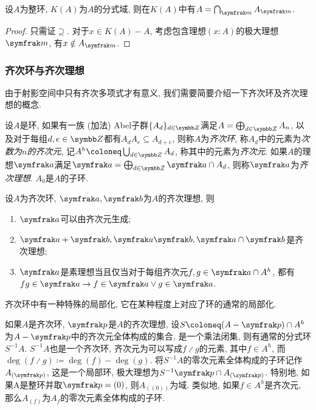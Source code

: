 \begin{proposition}\label{prop:integraldomainlocalizationintersection}
  设$A$为整环, $K(A)$为$A$的分式域, 则在$K(A)$中有$A=\bigcap_{\ideal{m}}A_{\ideal{m}}$.
\end{proposition}

\begin{proof}
  只需证$\supseteq$. 对于$x\in K(A)-A$, 考虑包含理想$(x{:}A)$的极大理想$\ideal{m}$, 有$x\notin A_{\ideal{m}}$.
\end{proof}

\subsubsection{齐次环与齐次理想}

由于射影空间中只有齐次多项式才有意义, 我们需要简要介绍一下齐次环及齐次理想的概念.

\begin{definition}
  设$A$是环, 如果有一族 (加法) Abel子群$\{A_d\}_{d\in \ZZ}$满足$A=\bigoplus_{d\in\ZZ}A_n$, 以及对于每组$d, e\in \ZZ$都有$A_dA_e\subseteq A_{d+e}$, 则称$A$为\emph{齐次环}, 称$A_d$中的元素为\emph{次数为$n$的齐次元}, 记$A^h\coloneq\bigcup_{d\in\ZZ}A_d$, 称其中的元素为\emph{齐次元}. 如果$A$的理想$\ideal{a}$满足$\ideal{a}=\bigoplus_{d\in \ZZ}\ideal{a}\cap A_d$, 则称$\ideal{a}$为\emph{齐次理想}. $A_0$是$A$的子环.
\end{definition}

\begin{proposition}
  设$A$为齐次环, $\ideal{a}, \ideal{b}$为$A$的齐次理想, 则
  \begin{enumerate}
    \item $\ideal{a}$可以由齐次元生成;
    \item $\ideal{a}+\ideal{b}, \ideal{a}\ideal{b}, \ideal{a}\cap\ideal{b}$是齐次理想;
    \item $\ideal{a}$是素理想当且仅当对于每组齐次元$f, g\in\ideal{a}\cap A^h$, 都有$fg\in \ideal{a}\rightarrow f\in\ideal{a}\vee g\in\ideal{a}$.
  \end{enumerate}
\end{proposition}

齐次环中有一种特殊的局部化, 它在某种程度上对应了环的通常的局部化.

\begin{definition}
  如果$A$是齐次环, $\ideal{p}$是$A$的齐次理想, 设$S\coloneq (A-\ideal{p})\cap A^h$为$A-\ideal{p}$中的齐次元全体构成的集合, 是一个乘法闭集, 则有通常的分式环$S^{-1}A$. $S^{-1}A$也是一个齐次环, 齐次元为可以写成$f{\divslash}g$的元素, 其中$f\in A^h$, 而$\deg (f{\divslash}g)\coloneq \deg (f)-\deg (g)$. 将$S^{-1}A$的零次元素全体构成的子环记作$A_{(\ideal{p})}$, 这是一个局部环, 极大理想为$S^{-1}\ideal{p}\cap A_{(\ideal{p})}$. 特别地, 如果A是整环并取$\ideal{p}=(0)$, 则$A_{((0))}$为域. 类似地, 如果$f\in A^h$是齐次元, 那么$A_{(f)}$为$A_f$的零次元素全体构成的子环.
\end{definition}

